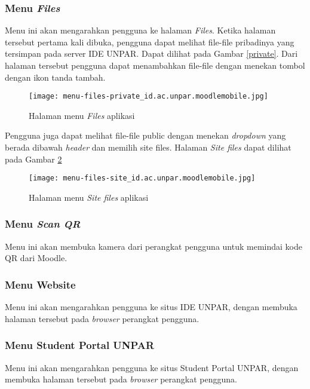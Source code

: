 \subsubsection{Menu \textit{Files}}
\label{menu-files}

Menu ini akan mengarahkan pengguna ke halaman \textit{Files}. Ketika halaman tersebut pertama kali dibuka, pengguna dapat melihat file-file pribadinya yang tersimpan pada server IDE UNPAR. Dapat dilihat pada Gambar \ref{private}. Dari halaman tersebut pengguna dapat menambahkan file-file dengan menekan tombol dengan ikon tanda tambah.


\begin{figure}[H] 
	\centering  
	\texttt{[image: menu-files-private\_id.ac.unpar.moodlemobile.jpg]}  
	\caption[Halaman menu \textit{Files} aplikasi] {Halaman menu \textit{Files} aplikasi} 
	\label{app:menu:files:private} 
\end{figure}  

 Pengguna juga dapat melihat file-file public dengan menekan \textit{dropdown} yang berada dibawah \textit{header} dan memilih site files. Halaman \textit{Site files} dapat dilihat pada Gambar \ref{app:menu:files:site}

\begin{figure}[H] 
	\centering  
	\texttt{[image: menu-files-site\_id.ac.unpar.moodlemobile.jpg]}  
	\caption[Halaman menu \textit{Site files} aplikasi] {Halaman menu \textit{Site files} aplikasi} 
	\label{app:menu:files:site} 
\end{figure}  

\subsubsection{Menu \textit{Scan QR}}

Menu ini akan membuka kamera dari perangkat pengguna untuk memindai kode QR dari Moodle.

\subsubsection{Menu Website}

Menu ini akan mengarahkan pengguna ke situs IDE UNPAR, dengan membuka halaman tersebut pada \textit{browser} perangkat pengguna.

\subsubsection{Menu Student Portal UNPAR}
Menu ini akan mengarahkan pengguna ke situs Student Portal UNPAR, dengan membuka halaman tersebut pada \textit{browser} perangkat pengguna.

